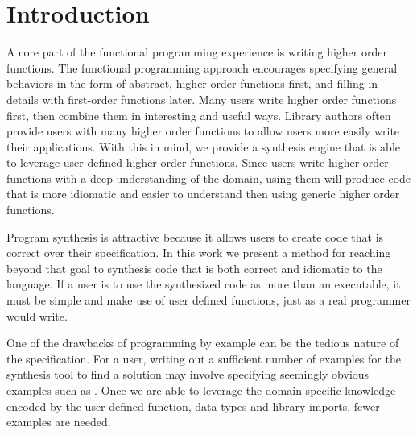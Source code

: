 \section{Introduction} 
\label{intro}

A core part of the functional programming experience is writing higher order functions. The functional programming approach encourages specifying general behaviors in the form of abstract, higher-order functions first, and filling in details with first-order functions later. Many users write higher order functions first, then combine them in interesting and useful ways. Library authors often provide users with many higher order functions to allow users more easily write their applications. With this in mind, we provide a synthesis engine that is able to leverage user defined higher order functions.
Since users write higher order functions with a deep understanding of the domain, using them will produce code that is more idiomatic and easier to understand then using generic higher order functions.

Program synthesis is attractive because it allows users to create code that is correct over their specification. In this work we present a method for reaching beyond that goal to synthesis code that is both correct and idiomatic to the language. If a user is to use the synthesized code as more than an executable, it must be simple and make use of user defined functions, just as a real programmer would write.

One of the drawbacks of programming by example can be the tedious nature of the specification. 
For a user, writing out a sufficient number of examples for the synthesis tool to find a solution may involve specifying seemingly obvious examples such as \codeinline{[]->[]}.
Once we are able to leverage the domain specific knowledge encoded by the user defined function, data types and library imports, fewer examples are needed.
